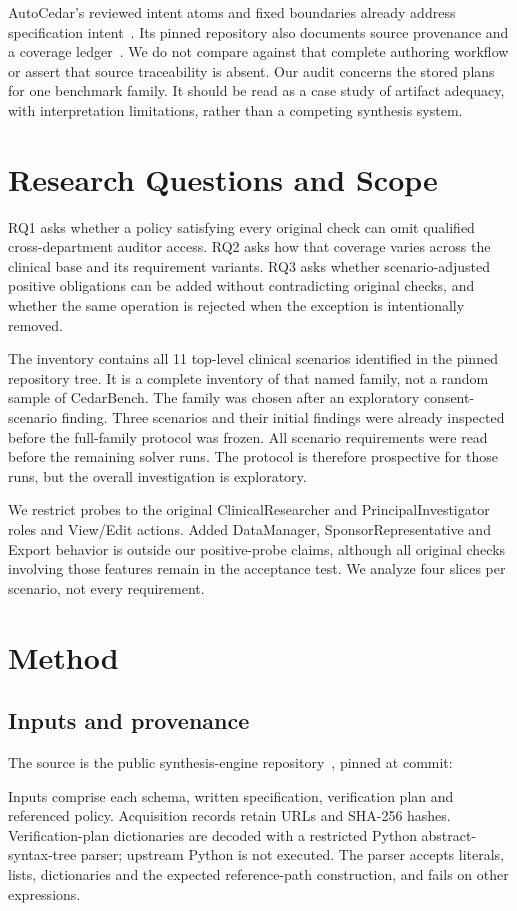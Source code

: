 \documentclass[sigconf,nonacm]{acmart}
\begin{document}
AutoCedar's reviewed intent atoms and fixed boundaries already address specification intent~\cite{autocedar}. Its pinned repository also documents source provenance and a coverage ledger~\cite{artifact}. We do not compare against that complete authoring workflow or assert that source traceability is absent. Our audit concerns the stored plans for one benchmark family. It should be read as a case study of artifact adequacy, with interpretation limitations, rather than a competing synthesis system.

\section{Research Questions and Scope}
RQ1 asks whether a policy satisfying every original check can omit qualified cross-department auditor access. RQ2 asks how that coverage varies across the clinical base and its requirement variants. RQ3 asks whether scenario-adjusted positive obligations can be added without contradicting original checks, and whether the same operation is rejected when the exception is intentionally removed.

The inventory contains all 11 top-level clinical scenarios identified in the pinned repository tree. It is a complete inventory of that named family, not a random sample of CedarBench. The family was chosen after an exploratory consent-scenario finding. Three scenarios and their initial findings were already inspected before the full-family protocol was frozen. All scenario requirements were read before the remaining solver runs. The protocol is therefore prospective for those runs, but the overall investigation is exploratory.

We restrict probes to the original ClinicalResearcher and PrincipalInvestigator roles and View/Edit actions. Added DataManager, SponsorRepresentative and Export behavior is outside our positive-probe claims, although all original checks involving those features remain in the acceptance test. We analyze four slices per scenario, not every requirement.

\section{Method}
\subsection{Inputs and provenance}
The source is the public synthesis-engine repository~\cite{artifact}, pinned at commit:
\par{}\par
Inputs comprise each schema, written specification, verification plan and referenced policy. Acquisition records retain URLs and SHA-256 hashes. Verification-plan dictionaries are decoded with a restricted Python abstract-syntax-tree parser; upstream Python is not executed. The parser accepts literals, lists, dictionaries and the expected reference-path construction, and fails on other expressions.
\end{document}
